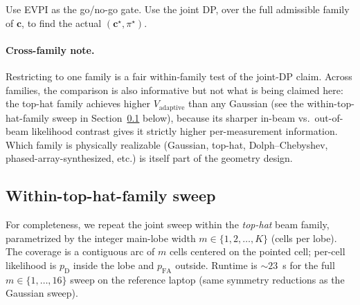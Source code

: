 \documentclass[11pt,a4paper]{article}
\begin{document}
Use EVPI as the go/no-go gate.  Use the joint DP, over the full admissible family of $\bm{c}$, to find the actual $(\bm{c}^\star, \pi^\star)$.

\paragraph{Cross-family note.}
Restricting to one family is a fair within-family test of the joint-DP claim.  Across families, the comparison is also informative but not what is being claimed here: the top-hat family achieves higher $V_{\text{adaptive}}$ than any Gaussian (see the within-top-hat-family sweep in Section~\ref{subsec:tophat_sweep} below), because its sharper in-beam vs.\ out-of-beam likelihood contrast gives it strictly higher per-measurement information.  Which family is physically realizable (Gaussian, top-hat, Dolph--Chebyshev, phased-array-synthesized, etc.) is itself part of the geometry design.

\subsection{Within-top-hat-family sweep}
\label{subsec:tophat_sweep}

For completeness, we repeat the joint sweep within the \emph{top-hat} beam family, parametrized by the integer main-lobe width $m \in \{1, 2, \ldots, K\}$ (cells per lobe).  The coverage is a contiguous arc of $m$ cells centered on the pointed cell; per-cell likelihood is $p_{\mathrm{D}}$ inside the lobe and $p_{\mathrm{FA}}$ outside.  Runtime is $\sim\!23$~s for the full $m \in \{1,\ldots,16\}$ sweep on the reference laptop (same symmetry reductions as the Gaussian sweep).
\end{document}
